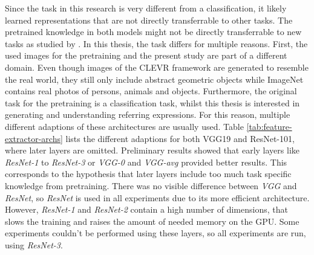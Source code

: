 Since the task in this research is very different from a classification, it likely learned representations that are not directly transferrable to other tasks.
The pretrained knowledge in both models might not be directly transferrable to new tasks as studied by \citet{Yosinski2014}.
In this thesis, the task differs for multiple reasons.
First, the used images for the pretraining and the present study are part of a different domain.
Even though images of the CLEVR framework are generated to resemble the real world, they still only include abstract geometric objects while ImageNet contains real photos of persons, animals and objects.
Furthermore, the original task for the pretraining is a classification task, whilst this thesis is interested in generating and understanding referring expressions.
For this reason, multiple different adaptions of these architectures are usually used.
Table \ref{tab:feature-extractor-archs} lists the different adaptions for both VGG19 and ResNet-101, where later layers are omitted.
Preliminary results showed that early layers like \emph{ResNet-1} to \emph{ResNet-3} or \emph{VGG-0} and \emph{VGG-avg} provided better results.
This corresponds to the hypothesis that later layers include too much task specific knowledge from pretraining.
There was no visible difference between \emph{VGG} and \emph{ResNet}, so \emph{ResNet} is used in all experiments due to its more efficient architecture.
However, \emph{ResNet-1} and \emph{ResNet-2} contain a high number of dimensions, that slows the training and raises the amount of needed memory on the GPU.
Some experiments couldn't be performed using these layers, so all experiments are run, using \emph{ResNet-3}.

